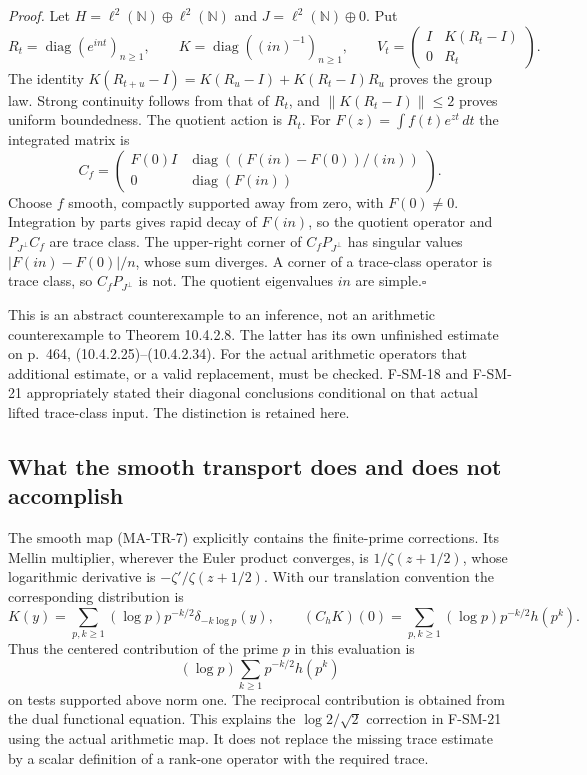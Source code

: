 \emph{Proof.}
Let $H=\ell^2(\mathbb N)\oplus\ell^2(\mathbb N)$ and
$J=\ell^2(\mathbb N)\oplus0$. Put
\[
 R_t=\operatorname{diag}(e^{int})_{n\ge1},\qquad
 K=\operatorname{diag}((in)^{-1})_{n\ge1},\qquad
 V_t=\begin{pmatrix}I&K(R_t-I)\\0&R_t\end{pmatrix}.
 \tag{MA-TR-10}
\]
The identity $K(R_{t+u}-I)=K(R_u-I)+K(R_t-I)R_u$ proves the
group law. Strong continuity follows from that of $R_t$, and
$\|K(R_t-I)\|\le2$ proves uniform boundedness. The quotient
action is $R_t$. For $F(z)=\int f(t)e^{zt}\,dt$ the integrated
matrix is
\[
 C_f=\begin{pmatrix}
 F(0)I&\operatorname{diag}((F(in)-F(0))/(in))\\
 0&\operatorname{diag}(F(in))
 \end{pmatrix}.
 \tag{MA-TR-11}
\]
Choose $f$ smooth, compactly supported away from zero, with
$F(0)\ne0$. Integration by parts gives rapid decay of $F(in)$,
so the quotient operator and $P_{J^\perp}C_f$ are trace class.
The upper-right corner of $C_fP_{J^\perp}$ has singular values
$|F(in)-F(0)|/n$, whose sum diverges. A corner of a trace-class
operator is trace class, so $C_fP_{J^\perp}$ is not.
The quotient eigenvalues $in$ are simple.\hfill$\square$

This is an abstract counterexample to an inference, not an arithmetic
counterexample to Theorem 10.4.2.8. The latter has its own unfinished
estimate on p.~464, (10.4.2.25)--(10.4.2.34). For the actual
arithmetic operators that additional estimate, or a valid replacement,
must be checked. F-SM-18 and F-SM-21 appropriately stated their
diagonal conclusions conditional on that actual lifted trace-class
input. The distinction is retained here.

\subsection{What the smooth transport does and does not accomplish}

The smooth map (MA-TR-7) explicitly contains the finite-prime
corrections. Its Mellin multiplier, wherever the Euler product
converges, is $1/\zeta(z+1/2)$, whose logarithmic derivative is
$-\zeta'/\zeta(z+1/2)$. With our translation convention the
corresponding distribution is
\[
 K(y)=\sum_{p,k\ge1}(\log p)p^{-k/2}\delta_{-k\log p}(y),
 \qquad
 (C_hK)(0)=\sum_{p,k\ge1}(\log p)p^{-k/2}h(p^k).
\]
Thus the centered contribution of the prime $p$ in this evaluation is
\[
 (\log p)\sum_{k\ge1}p^{-k/2}h(p^k)
\]
on tests supported above norm one. The reciprocal contribution is
obtained from the dual functional equation. This explains the
$\log2/\sqrt2$ correction in F-SM-21 using the actual arithmetic
map. It does not replace the missing trace estimate by a scalar
definition of a rank-one operator with the required trace.

